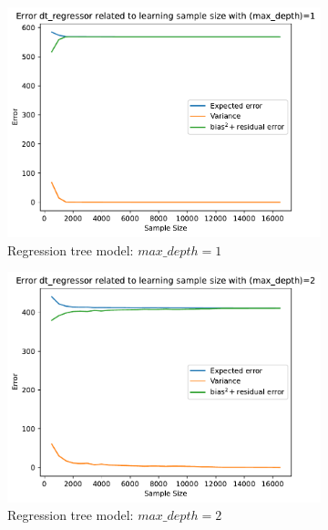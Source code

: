 \documentclass[12pt,titlepage]{article}
\begin{document}
\begin{figure}[H]
    \centering
    \begin{subfigure}[t]{.49\textwidth}
        \includegraphics[width =\textwidth]{image/2.4_dt_regressor_1-500-17000-500.pdf}
        \caption{Regression tree model: $max\_depth = 1$}
        \label{fig:ls_dt_1}
    \end{subfigure}
    \hfill
    \begin{subfigure}[t]{.49\textwidth}
        \includegraphics[width =\textwidth]{image/2.4_dt_regressor_2-500-17000-500.pdf}
        \caption{Regression tree model: $max\_depth = 2$}
        \label{fig:ls_dt_2}
    \end{subfigure}
    \hfill
    \begin{subfigure}[t]{.49\textwidth}

\end{subfigure}
\end{figure}
\end{document}
